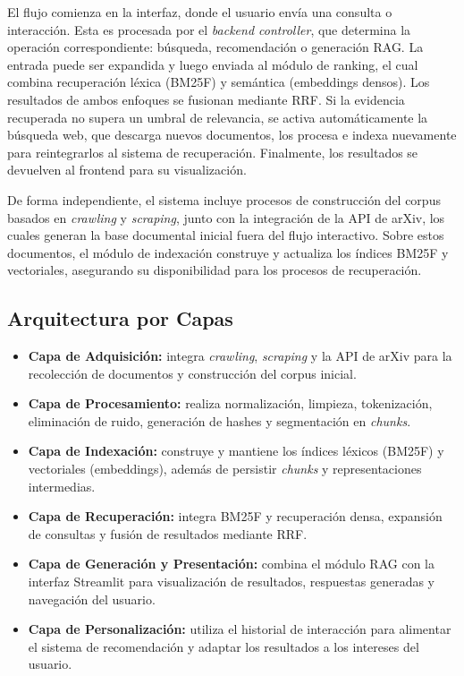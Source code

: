 \documentclass[runningheads]{llncs}
\begin{document}
El flujo comienza en la interfaz, donde el usuario envía una consulta o interacción. 
Esta es procesada por el \textit{backend controller}, que determina la operación correspondiente: búsqueda, recomendación o generación RAG. 
La entrada puede ser expandida y luego enviada al módulo de ranking, el cual combina recuperación léxica (BM25F) y semántica (embeddings densos). 
Los resultados de ambos enfoques se fusionan mediante RRF. Si la evidencia recuperada no supera un umbral de relevancia, 
se activa automáticamente la búsqueda web, que descarga nuevos documentos, los procesa e indexa nuevamente para reintegrarlos al sistema de recuperación. 
Finalmente, los resultados se devuelven al frontend para su visualización.

De forma independiente, el sistema incluye procesos de construcción del corpus basados en \textit{crawling} y \textit{scraping}, 
junto con la integración de la API de arXiv, los cuales generan la base documental inicial fuera del flujo interactivo. 
Sobre estos documentos, el módulo de indexación construye y actualiza los índices BM25F y vectoriales, asegurando su disponibilidad para los procesos de recuperación.

\subsection{Arquitectura por Capas}

\begin{itemize}
\item \textbf{Capa de Adquisición:} integra \textit{crawling}, \textit{scraping} y la API de arXiv para la recolección de documentos y construcción del corpus inicial.

\item \textbf{Capa de Procesamiento:} realiza normalización, limpieza, tokenización, eliminación de ruido, generación de hashes y segmentación en \textit{chunks}.

\item \textbf{Capa de Indexación:} construye y mantiene los índices léxicos (BM25F) y vectoriales (embeddings), además de persistir \textit{chunks} y 
representaciones intermedias.

\item \textbf{Capa de Recuperación:} integra BM25F y recuperación densa, expansión de consultas y fusión de resultados mediante RRF.

\item \textbf{Capa de Generación y Presentación:} combina el módulo RAG con la interfaz Streamlit para visualización de resultados, respuestas generadas 
y navegación del usuario.

\item \textbf{Capa de Personalización:} utiliza el historial de interacción para alimentar el sistema de recomendación 
y adaptar los resultados a los intereses del usuario.
\end{itemize}
\end{document}
